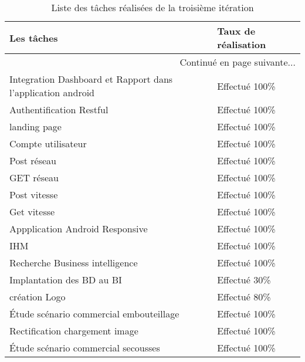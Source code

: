 \begin{center}
    \begin{longtable}{| l | l |}
        \caption{Liste des tâches réalisées de la troisième itération}
        \label{tab:sprint3-evaluation} \\

        \hline
        \textbf{Les tâches} & \textbf{Taux de réalisation} \\ \hline
        \endhead

        \hline \multicolumn{2}{|r|}{{Continué en page suivante$\dotsc$}} \\ \hline
        \endfoot

        \hline \hline
        \endlastfoot

        \hline
Integration Dashboard et Rapport dans l'application android & Effectué 100\% \\ \hline
Authentification Restful&  Effectué 100\% \\ \hline
landing page& Effectué 100\% \\ \hline
Compte utilisateur& Effectué 100\% \\ \hline
Post réseau& Effectué 100\% \\ \hline
GET réseau&  Effectué 100\% \\ \hline
Post vitesse&  Effectué 100\% \\ \hline
Get vitesse& Effectué 100\% \\ \hline
Appplication Android Responsive & Effectué 100\% \\ \hline
IHM & Effectué 100\% \\ \hline
Recherche Business intelligence& Effectué 100\% \\ \hline
Implantation des BD au BI & Effectué 30\% \\ \hline
création Logo&  Effectué 80\% \\ \hline
Étude scénario commercial embouteillage& Effectué 100\% \\ \hline
Rectification chargement image & Effectué 100\% \\ \hline
Étude scénario commercial secousses &  Effectué 100\% \\ \hline
\end{longtable}
\end{center}
